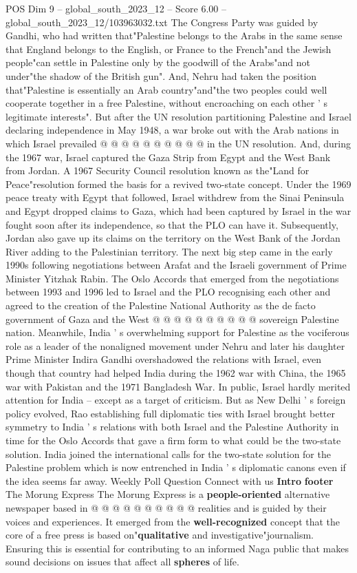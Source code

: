 \begin{textsample}{POS Dim 9 – global\_south\_2023\_12 – Score 6.00 – global\_south\_2023\_12/103963032.txt}
The Congress Party was guided by Gandhi, who had written that"Palestine belongs to the Arabs in the same sense that England belongs to the English, or France to the French"and the Jewish people"can settle in Palestine only by the goodwill of the Arabs"and not under"the shadow of the British gun".
And, Nehru had taken the position that"Palestine is essentially an Arab country"and"the two peoples could well cooperate together in a free Palestine, without encroaching on each other ' s legitimate interests".
But after the UN resolution partitioning Palestine and Israel declaring independence in May 1948, a war broke out with the Arab nations in which Israel prevailed @ @ @ @ @ @ @ @ @ @ in the UN resolution.
And, during the 1967 war, Israel captured the Gaza Strip from Egypt and the West Bank from Jordan.
A 1967 Security Council resolution known as the"Land for Peace"resolution formed the basis for a revived two-state concept.
Under the 1969 peace treaty with Egypt that followed, Israel withdrew from the Sinai Peninsula and Egypt dropped claims to Gaza, which had been captured by Israel in the war fought soon after its independence, so that the PLO can have it.
Subsequently, Jordan also gave up its claims on the territory on the West Bank of the Jordan River adding to the Palestinian territory.
The next big step came in the early 1990s following negotiations between Arafat and the Israeli government of Prime Minister Yitzhak Rabin.
The Oslo Accords that emerged from the negotiations between 1993 and 1996 led to Israel and the PLO recognising each other and agreed to the creation of the Palestine National Authority as the de facto government of Gaza and the West @ @ @ @ @ @ @ @ @ @ sovereign Palestine nation.
Meanwhile, India ' s overwhelming support for Palestine as the vociferous role as a leader of the nonaligned movement under Nehru and later his daughter Prime Minister Indira Gandhi overshadowed the relations with Israel, even though that country had helped India during the 1962 war with China, the 1965 war with Pakistan and the 1971 Bangladesh War.
In public, Israel hardly merited attention for India -- except as a target of criticism.
But as New Delhi ' s foreign policy evolved, Rao establishing full diplomatic ties with Israel brought better symmetry to India ' s relations with both Israel and the Palestine Authority in time for the Oslo Accords that gave a firm form to what could be the two-state solution.
India joined the international calls for the two-state solution for the Palestine problem which is now entrenched in India ' s diplomatic canons even if the idea seems far away.
Weekly Poll Question Connect with us \textbf{Intro} \textbf{footer} The Morung Express The Morung Express is a \textbf{people-oriented} alternative newspaper based in @ @ @ @ @ @ @ @ @ @ realities and is guided by their voices and experiences.
It emerged from the \textbf{well-recognized} concept that the core of a free press is based on"\textbf{qualitative} and investigative"journalism.
Ensuring this is essential for contributing to an informed Naga public that makes sound decisions on issues that affect all \textbf{spheres} of life.


\end{textsample}
